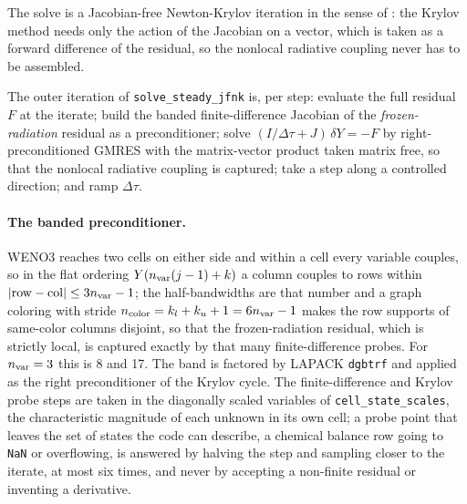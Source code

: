 The solve is a Jacobian-free Newton-Krylov iteration in the sense of
\citet{Knoll2004}: the Krylov method needs only the action of the Jacobian on
a vector, which is taken as a forward difference of the residual, so the
nonlocal radiative coupling never has to be assembled.

The outer iteration of \texttt{solve\_steady\_jfnk} is, per step: evaluate the
full residual $F$ at the iterate; build the banded finite-difference Jacobian
of the \emph{frozen-radiation} residual as a preconditioner; solve
$(I/\Delta\tau + J)\,\delta Y = -F$ by right-preconditioned GMRES with the
matrix-vector product taken matrix free, so that the nonlocal radiative
coupling is captured; take a step along a controlled direction; and ramp
$\Delta\tau$.

\paragraph{The banded preconditioner.}
WENO3 reaches two cells on either side and within a cell every variable
couples, so in the flat ordering $Y(n_{\rm var}(j-1)+k)$ a column couples to
rows within $|{\rm row} - {\rm col}| \le 3n_{\rm var}-1$; the half-bandwidths
are that number and a graph coloring with stride
$n_{\rm color} = k_l + k_u + 1 = 6n_{\rm var}-1$ makes the row supports of
same-color columns disjoint, so that the frozen-radiation residual, which is
strictly local, is captured exactly by that many finite-difference probes.  For
$n_{\rm var} = 3$ this is 8 and 17.  The band is factored by LAPACK
\texttt{dgbtrf} and applied as the right preconditioner of the Krylov cycle.
The finite-difference and Krylov probe steps are taken in the diagonally
scaled variables of \texttt{cell\_state\_scales}, the characteristic magnitude
of each unknown in its own cell; a probe point that leaves the set of states
the code can describe, a chemical balance row going to \texttt{NaN} or
overflowing, is answered by halving the step and sampling closer to the
iterate, at most six times, and never by accepting a non-finite residual or
inventing a derivative.

